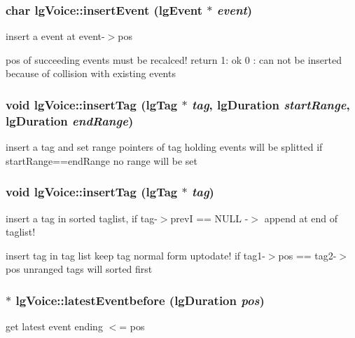 \subsubsection{\setlength{\rightskip}{0pt plus 5cm}char lg\-Voice::insert\-Event ({\bf lg\-Event} $\ast$ {\em event})\hspace{0.3cm}{\tt  [virtual]}}\label{classlgVoice_a19}


insert a event at event-$>$pos 

pos of succeeding events must be recalced! return 1: ok 0 : can not be inserted because of collision with existing events
\subsubsection{\setlength{\rightskip}{0pt plus 5cm}void lg\-Voice::insert\-Tag ({\bf lg\-Tag} $\ast$ {\em tag}, {\bf lg\-Duration} {\em start\-Range}, {\bf lg\-Duration} {\em end\-Range})}\label{classlgVoice_a28}


insert a tag and set range pointers of tag holding events will be splitted if start\-Range==end\-Range no range will be set 
\subsubsection{\setlength{\rightskip}{0pt plus 5cm}void lg\-Voice::insert\-Tag ({\bf lg\-Tag} $\ast$ {\em tag})}\label{classlgVoice_a9}


insert a tag in sorted taglist, if tag-$>$prev\-I == NULL -$>$ append at end of taglist! 

insert tag in tag list keep tag normal form uptodate! if tag1-$>$pos == tag2-$>$pos unranged tags will sorted first 
\subsubsection{$\ast$ lg\-Voice::latest\-Eventbefore ({\bf lg\-Duration} {\em pos})}\label{classlgVoice_a26}


get latest event ending $<$= pos 

